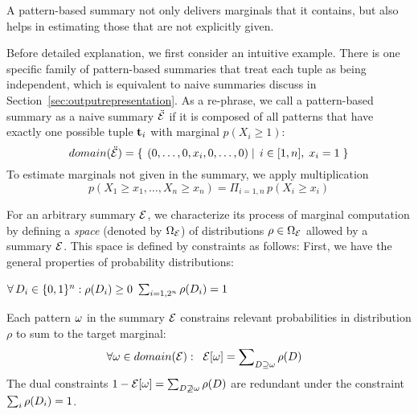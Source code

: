 A pattern-based summary not only delivers marginals that it contains, but also helps in estimating those that are not explicitly given.

Before detailed explanation, we first consider an intuitive example.
There is one specific family of pattern-based summaries that treat each tuple as being independent, which is equivalent to naive summaries discuss in Section~\ref{sec:outputrepresentation}.
As a re-phrase, we call a pattern-based summary as a naive summary $\ddot{\mathcal E}$ if it is composed of all patterns that have exactly one possible tuple $\mathbf{t}_i$ with marginal $p(X_i\geq 1)$:
$$domain(\ddot{\mathcal E})=\left\{\left.\;{(0, \ldots, 0, x_i, 0, \ldots, 0)}\;\right|\;{i \in [1,n],\; x_i = 1}\;\right\}$$
To estimate marginals not given in the summary, we apply multiplication $$p(X_1\geq x_1,\ldots,X_n\geq x_n)=\Pi_{i=1,n}\, p(X_i\geq x_i)$$

For an arbitrary summary $\mathcal E$, we characterize its process of marginal computation by defining a \emph{space} (denoted by $\Omega_\mathcal E$) of distributions $\rho \in \Omega_\mathcal E$ allowed by a summary $\mathcal E$.
This space is defined by constraints as follows:
First, we have the general properties of probability distributions:
\begin{center}
$\forall \, D_i\in \{0,1\}^n : \rho(D_i)\geq 0$
\hspace{10mm}
$\sum_{i=1,2^n}\rho(D_i)=1$
\end{center}
Each pattern $\omega$ in the summary $\mathcal E$ constrains relevant probabilities in distribution $\rho$ to sum to the target marginal:
\begin{equation*}
\forall \omega \in domain(\mathcal E)  :\;\; \mathcal E[\omega] = \sum\nolimits_{D\supseteq\omega} \rho(D) \;\;\;
\end{equation*}
The dual constraints $1-\mathcal E[\omega]=\sum_{D\not\supseteq\omega} \rho(D)$ are redundant under the constraint $\sum_i\rho(D_i)=1$.

